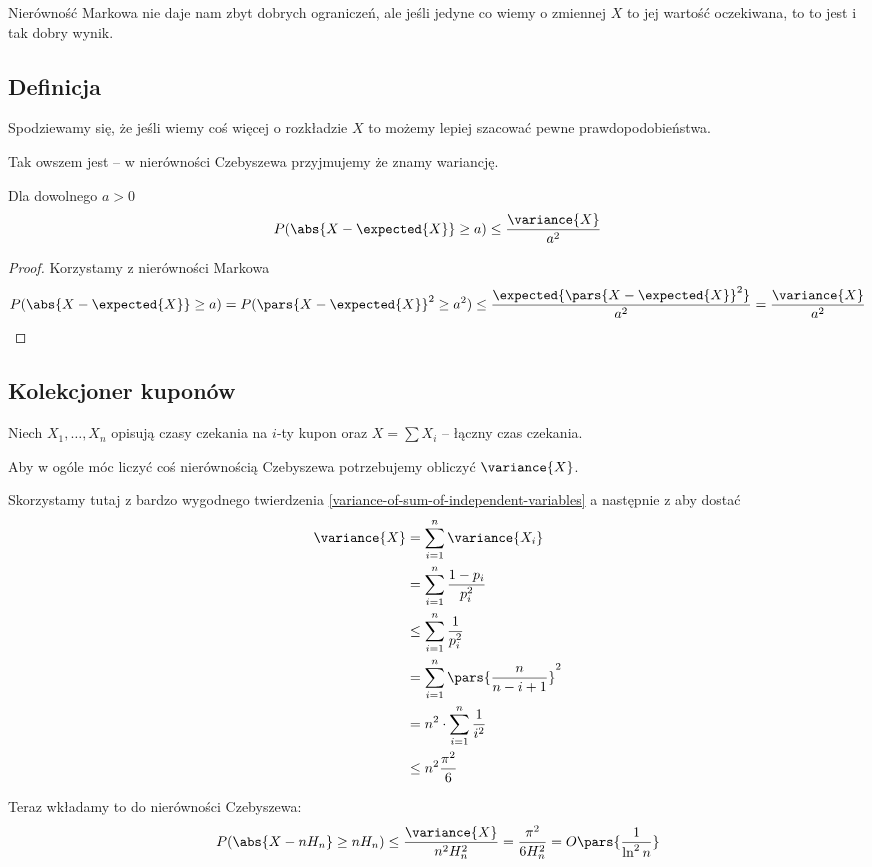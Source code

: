 Nierówność Markowa nie daje nam zbyt dobrych ograniczeń, ale jeśli jedyne co wiemy o zmiennej \( X \) to jej wartość oczekiwana, to to jest i tak dobry wynik.
\subsection{Definicja}
Spodziewamy się, że jeśli wiemy coś więcej o rozkładzie \( X \) to możemy lepiej szacować pewne prawdopodobieństwa.

Tak owszem jest -- w nierówności Czebyszewa przyjmujemy że znamy wariancję.

\begin{theorem}[Twierdzenie 3.6 P\&C]
    Dla dowolnego \( a > 0 \)
    \[
        P(\abs{X - \expected{X}} \geq a) \leq \frac{\variance{X}}{a^2}
    \]
\end{theorem}
\begin{proof}
Korzystamy z nierówności Markowa
    \[
        P(\abs{X - \expected{X}} \geq a) = P(\pars{X - \expected{X}}^2 \geq a^2) 
        \leq \frac{\expected{\pars{X - \expected{X}}^2}}{a^2} = \frac{\variance{X}}{a^2}
    \]
\end{proof}

\subsection{Kolekcjoner kuponów}
Niech \( X_1, \dots, X_n \) opisują czasy czekania na \( i \)-ty kupon oraz \( X = \sum X_i \) -- łączny czas czekania.

Aby w ogóle móc liczyć coś nierównością Czebyszewa potrzebujemy obliczyć \( \variance{X} \).

Skorzystamy tutaj z bardzo wygodnego twierdzenia \ref{variance-of-sum-of-independent-variables} 
a następnie z aby dostać
\begin{align*}
    \variance{X} 
        &= \sum_{i=1}^n \variance{X_i}  \\
        &= \sum_{i=1}^n \frac{1 - p_i}{p_i^2} \\
        &\leq \sum_{i=1}^n \frac{1}{p_i^2} \\
        &=\sum_{i=1}^n \pars{\frac{n}{n-i+1}}^2 \\
        &=n^2 \cdot \sum_{i=1}^n \frac{1}{i^2} \\
        &\leq n^2\frac{\pi^2}{6}
\end{align*}

Teraz wkładamy to do nierówności Czebyszewa:
\[
    P(\abs{X - nH_n} \geq nH_n) \leq \frac{\variance{X}}{n^2H_n^2} = \frac{\pi^2}{6H_n^2} = O\pars{\frac{1}{\ln^2 n}}
\]